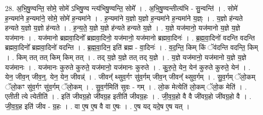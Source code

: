\documentclass[17pt]{extarticle}
\begin{document}
28. अ॒भि॒षु॒ण्वन्ति॒ सोमे॒ सोमे॑ ऽभिषु॒ण्व न्त्य॑भिषु॒ण्वन्ति॒ सोमे᳚ । . अ॒भि॒षु॒ण्वन्तीत्य॑भि - सु॒न्वन्ति॑ । . सोमे॑ ह॒न्यमा॑ने ह॒न्यमा॑ने॒ सोमे॒ सोमे॑ ह॒न्यमा॑ने । . ह॒न्यमा॑ने य॒ज्ञो य॒ज्ञो ह॒न्यमा॑ने ह॒न्यमा॑ने य॒ज्ञ्ः । . य॒ज्ञो ह॑न्यते हन्यते य॒ज्ञो य॒ज्ञो ह॑न्यते । . ह॒न्य॒ते॒ य॒ज्ञे य॒ज्ञे ह॑न्यते हन्यते य॒ज्ञे । . य॒ज्ञे यज॑मानो॒ यज॑मानो य॒ज्ञे य॒ज्ञे यज॑मानः । . यज॑मानो ब्रह्मवा॒दिनो᳚ ब्रह्मवा॒दिनो॒ यज॑मानो॒ यज॑मानो ब्रह्मवा॒दिनः॑ । . ब्र॒ह्म॒वा॒दिनो॑ वदन्ति वदन्ति ब्रह्मवा॒दिनो᳚ ब्रह्मवा॒दिनो॑ वदन्ति । . ब्र॒ह्म॒वा॒दिन॒ इति॑ ब्रह्म - वा॒दिनः॑ । . व॒द॒न्ति॒ किम् किं ॅव॑दन्ति वदन्ति॒ किम् । . किम् तत् तत् किम् किम् तत् । . तद् य॒ज्ञे य॒ज्ञे तत् तद् य॒ज्ञे । . य॒ज्ञे यज॑मानो॒ यज॑मानो य॒ज्ञे य॒ज्ञे यज॑मानः । . यज॑मानः कुरुते कुरुते॒ यज॑मानो॒ यज॑मानः कुरुते । . कु॒रु॒ते॒ येन॒ येन॑ कुरुते कुरुते॒ येन॑ । . येन॒ जीव॒न् जीव॒न्॒. येन॒ येन॒ जीवन्न्॑ । . जीवन्᳚ थ्सुव॒र्गꣳ सु॑व॒र्गम् जीव॒न् जीवन्᳚ थ्सुव॒र्गम् । . सु॒व॒र्गम् ॅलो॒कम् ॅलो॒कꣳ सु॑व॒र्गꣳ सु॑व॒र्गम् ॅलो॒कम् । . सु॒व॒र्गमिति॑ सुवः - गम् । . लो॒क मेत्येति॑ लो॒कम् ॅलो॒क मेति॑ । . एतीती त्ये त्येतीति॑ । . इति॑ जीवग्र॒हो जी॑वग्र॒ह इतीति॑ जीवग्र॒हः । . जी॒व॒ग्र॒हो वै वै जी॑वग्र॒हो जी॑वग्र॒हो वै । . जी॒व॒ग्र॒ह इति॑ जीव - ग्र॒हः । . वा ए॒ष ए॒ष वै वा ए॒षः । . ए॒ष यद् यदे॒ष ए॒ष यत् । \newline
\end{document}
